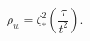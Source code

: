 \begin{equation}
\rho_w
   = \zeta^2_\ast 
       \left( \frac{\tau}{t^2}
       \right).  
\end{equation}


